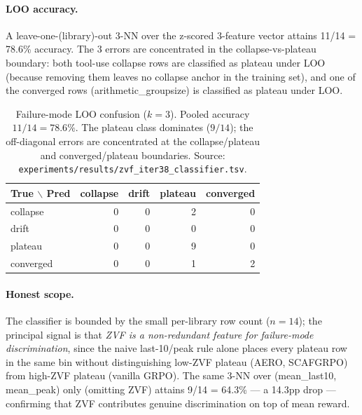 \documentclass{article}
\begin{document}
\paragraph{LOO accuracy.}
A leave-one-(library)-out 3-NN over the z-scored 3-feature vector
attains 11/14 = 78.6\% accuracy. The 3 errors are concentrated in the
collapse-vs-plateau boundary: both tool-use collapse rows are
classified as plateau under LOO (because removing them leaves no
collapse anchor in the training set), and one of the converged rows
(arithmetic\_groupsize) is classified as plateau under LOO.

\begin{table}[htbp]
\centering\small
\setlength{\tabcolsep}{4pt}
\begin{tabular}{lrrrr}
\hline
True $\backslash$ Pred & collapse & drift & plateau & converged \\
\hline
collapse & 0 & 0 & 2 & 0 \\
drift    & 0 & 0 & 0 & 0 \\
plateau  & 0 & 0 & 9 & 0 \\
converged & 0 & 0 & 1 & 2 \\
\hline
\end{tabular}
\caption{Failure-mode LOO confusion ($k{=}3$). Pooled accuracy
$11/14 = 78.6\%$. The plateau class dominates ($9/14$); the off-diagonal
errors are concentrated at the collapse/plateau and converged/plateau
boundaries. Source:
\texttt{experiments/results/zvf_iter38_classifier.tsv}.}
\label{tab:zvf-classifier-conf}
\end{table}

\paragraph{Honest scope.}
The classifier is bounded by the small per-library row count
($n{=}14$); the principal signal is that \emph{ZVF is a non-redundant
feature for failure-mode discrimination}, since the naive last-10/peak
rule alone places every plateau row in the same bin without
distinguishing low-ZVF plateau (AERO, SCAFGRPO) from high-ZVF plateau
(vanilla GRPO). The same 3-NN over (mean\_last10, mean\_peak) only
(omitting ZVF) attains 9/14 = 64.3\% — a 14.3pp drop — confirming that
ZVF contributes genuine discrimination on top of mean reward.
\end{document}
